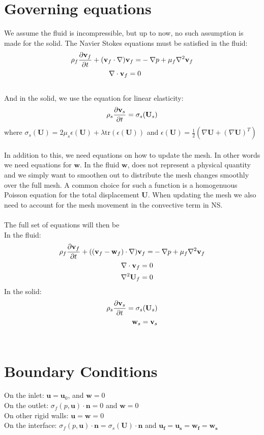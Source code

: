 \documentclass{article}
\begin{document}
\section{Governing equations}
We assume the fluid is incompressible, but up to now, no such assumption is made for the solid. The Navier Stokes equations must be satisfied in the fluid:
\begin{align}
\rho_f\frac{\partial \mathbf{v}_f}{\partial t} + (\mathbf{v}_f\cdot\nabla) \mathbf{v}_f = & -\nabla p + \mu_f\nabla^2 \mathbf{v}_f \\
\nabla \cdot \mathbf{v}_f = 0
\end{align}
\\
And in the solid, we use the equation for linear elasticity:
\begin{align}
\rho_s\frac{\partial \mathbf{v}_s}{\partial t} = \sigma_s(\mathbf{U}_s)
\end{align}
where $\sigma_s(\mathbf{U}) = 2\mu_s\epsilon(\mathbf{U}) + \lambda\text{tr}(\epsilon(\mathbf{U}))$ and $\epsilon(\mathbf{U}) = \frac{1}{2}(\nabla \mathbf{U} + (\nabla \mathbf{U})^T)$
\\
\\
In addition to this, we need equations on how to update the mesh. In other words we need equations for $\mathbf{w}$. In the fluid $\mathbf{w}$, does not represent a physical quantity and we simply want to smoothen out to distribute the mesh changes smoothly over the full mesh. A common choice for such a function is a homogenuous Poisson equation for the total displacement $\mathbf{U}$. When updating the mesh we also need to account for the mesh movement in the convective term in NS. \\
\\ The full set of equations will then be \\
In the fluid:
\begin{align}
\rho_f\frac{\partial \mathbf{v}_f}{\partial t} + ((\mathbf{v}_f-\mathbf{w}_f)\cdot\nabla) \mathbf{v}_f = & -\nabla p + \mu_f\nabla^2 \mathbf{v}_f \\
\nabla \cdot \mathbf{v}_f = 0 \\
\nabla^2 \mathbf{U}_f = 0   \label{NS}
\end{align}
In the solid:
\begin{align}
\rho_s\frac{\partial \mathbf{v}_s}{\partial t} = \sigma_s(\mathbf{U}_s) \\
\mathbf{w}_s = \mathbf{v}_s \label{LE}
\end{align}
\\
\section{Boundary Conditions}
On the inlet: $\mathbf{u} = \mathbf{u}_0$, and $\mathbf{w} = 0$ \\
On the outlet: $\sigma_f(p,\mathbf{u})\cdot \mathbf{n} = 0$ and $\mathbf{w} = 0$\\
On other rigid walls: $\mathbf{u} = \mathbf{w} = 0$  \\
On the interface: $\sigma_f(p,\mathbf{u}) \cdot \mathbf{n} = \sigma_s(\mathbf{U}) \cdot\mathbf{n} $ and $\mathbf{u_f} = \mathbf{u_s} = \mathbf{w_f} = \mathbf{w_s} $ \\
\end{document}
